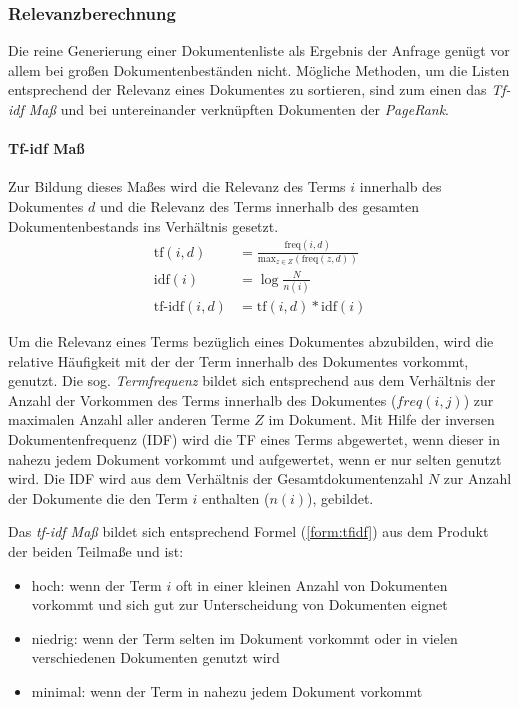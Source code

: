 \subsubsection{Relevanzberechnung}\label{sec:searchrelevance}\label{tfidf}
Die reine Generierung einer Dokumentenliste als Ergebnis der Anfrage genügt vor allem bei großen Dokumentenbeständen nicht. Mögliche Methoden, um die Listen  entsprechend der Relevanz eines Dokumentes zu sortieren, sind zum einen das \textit{Tf-idf Maß} und bei untereinander verknüpften Dokumenten der \textit{PageRank}.

\paragraph{Tf-idf Maß} Zur Bildung dieses Maßes wird die Relevanz des Terms $i$ innerhalb des Dokumentes $d$ und die Relevanz des Terms innerhalb des gesamten Dokumentenbestands ins Verhältnis gesetzt.
\begin{align}
\text{tf}(i, d) & = \frac{\text{freq}(i, d)}{\text{max}_{z \in Z}(\text{freq}(z, d))} \\
\text{idf}(i) & = \log{\frac{N}{n(i)}} \\
\text{tf-idf}(i, d) & = \text{tf}(i ,d) \ast \text{idf}(i) \label{form:tfidf}
\end{align}

Um die Relevanz eines Terms bezüglich eines Dokumentes abzubilden, wird die relative Häufigkeit mit der der Term innerhalb des Dokumentes vorkommt, genutzt. Die sog. \textit{Termfrequenz} bildet sich entsprechend aus dem Verhältnis der Anzahl der Vorkommen des Terms innerhalb des Dokumentes ($freq(i,j)$) zur maximalen Anzahl aller anderen Terme $Z$ im Dokument. Mit Hilfe der inversen Dokumentenfrequenz (\acs{IDF}) wird die \acf{TF} eines Terms abgewertet, wenn dieser in nahezu jedem Dokument vorkommt und aufgewertet, wenn er nur selten genutzt wird. Die \acs{IDF} wird aus dem Verhältnis der Gesamtdokumentenzahl $N$ zur Anzahl der Dokumente die den Term $i$ enthalten ($n(i)$), gebildet.

Das \textit{tf-idf Maß} bildet sich entsprechend Formel (\ref{form:tfidf}) aus dem Produkt der beiden Teilmaße und ist:
\begin{itemize}
\item hoch: wenn der Term $i$ oft in einer kleinen Anzahl von Dokumenten vorkommt und sich gut zur Unterscheidung von Dokumenten eignet
\item niedrig: wenn der Term selten im Dokument vorkommt oder in vielen verschiedenen Dokumenten genutzt wird
\item minimal: wenn der Term in nahezu jedem Dokument vorkommt
\end{itemize}

